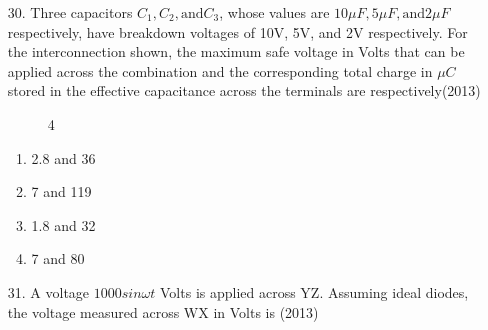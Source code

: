 \documentclass[journal]{IEEEtran}
\begin{document}
\begin{enumerate}
\begin{enumerate}[label=(\Alph*)]
    \end{enumerate}
    \item[30.] Three capacitors $C_1, C_2, \text{and} C_3$, whose values are $10\mu F, 5\mu F, \text{and} 2\mu F$ respectively, have
    breakdown voltages of 10V, 5V, and 2V respectively. For the interconnection shown, the maximum
    safe voltage in Volts that can be applied across the combination and the corresponding total charge
    in $\mu C$ stored in the effective capacitance across the terminals are respectively\hfill (2013)
    \begin{figure}[!ht]
        \centering
        \caption{4}
    \end{figure}
    \begin{enumerate}[label=(\Alph*)]
        \item 2.8 and 36
        \item 7 and 119
        \item 1.8 and 32
        \item 7 and 80
    \end{enumerate}
    \item[31.] A voltage $1000sin\omega t$ Volts is applied across YZ. Assuming ideal diodes, the voltage measured
    across WX in Volts is \hfill (2013)
    \begin{figure}[!ht]
        \centering
\end{figure}
\end{enumerate}
\end{document}
